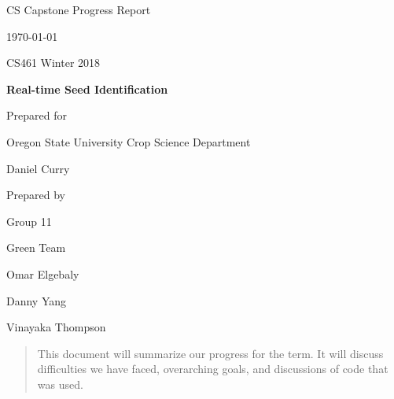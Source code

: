 \documentclass[onecolumn, draftclsnofoot,10pt, compsoc]{IEEEtran}
\def \CapstoneTeamName{			Green Team}
\def \CapstoneTeamNumber{		11}
\def \GroupMemberOne{			Omar Elgebaly}
\def \GroupMemberTwo{			Danny Yang}
\def \GroupMemberThree{			Vinayaka Thompson}
\def \CapstoneProjectName{		Real-time Seed Identification}
\def \CapstoneSponsorCompany{	Oregon State University Crop Science Department}
\def \CapstoneSponsorPerson{	Daniel Curry}
\def \DocType{	%
				Progress Report
				}
\newcommand{\NameSigPair}[1]{\par
\makebox[2.75in][r]{#1} \hfil 	\makebox[3.25in]{\makebox[2.25in]{\hrulefill} \hfill		\makebox[.75in]{\hrulefill}}
\par\vspace{-12pt} \textit{\tiny\noindent
\makebox[2.75in]{} \hfil		\makebox[3.25in]{\makebox[2.25in][r]{Signature} \hfill	\makebox[.75in][r]{Date}}}}
\renewcommand{\NameSigPair}[1]{#1}
\begin{document}
\begin{titlepage}
    \begin{singlespace}
        \hfill 
        \par\vspace{.2in}
        \centering
        \scshape{
            \huge CS Capstone \DocType \par
            {\large\today}\par
			{\large CS461 Winter 2018}\par
            \vspace{.5in}
            \textbf{\Huge\CapstoneProjectName}\par
            \vfill
            {\large Prepared for}\par
            \Huge \CapstoneSponsorCompany\par
            \vspace{5pt}
            {\Large\NameSigPair{\CapstoneSponsorPerson}\par}
            {\large Prepared by }\par
            Group\CapstoneTeamNumber\par
            \CapstoneTeamName\par 
            \vspace{5pt}
            {\Large
                \NameSigPair{\GroupMemberOne}\par
                \NameSigPair{\GroupMemberTwo}\par
                \NameSigPair{\GroupMemberThree}\par
            }
            \vspace{20pt}
        }
        \begin{abstract}
        This document will summarize our progress for the term. It will discuss difficulties we have faced, overarching goals, and discussions of code that was used. 


        \end{abstract}     
    \end{singlespace}
\end{titlepage}
\newpage
{}
\tableofcontents
\clearpage
\end{document}
